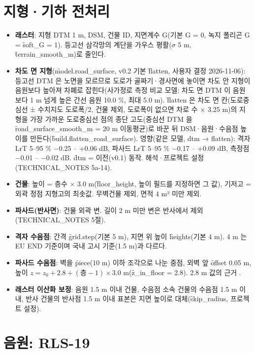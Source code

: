 \documentclass[10.5pt,a4paper]{article}
\begin{document}
\section{지형·기하 전처리}
\begin{itemize}
\item \textbf{래스터}: 지형 DTM 1 m, DSM, 건물 ID, 지면계수 G(기본 G = 0, 녹지 폴리곤 G = \f{soft\_G} = 1). 등고선 삼각망의 계단을 가우스 평활($\sigma$ 5 m, \f{terrain\_smooth\_m})로 줄인다.
\item \textbf{차도 면 지형}(\f{model.road\_surface}, v0.2 기본 \f{flatten}, 사용자 결정 2026-11-06): 등고선 DTM 은 노면을 모르므로 도로가 골짜기·경사면에 놓이면 차도 안 지형이 음원보다 높아져 차폐로 잡힌다(사가정로 측정 비교 모델: 차도 면 DTM 이 음원보다 1 m 넘게 높은 간선 음원 10.0 \%, 최대 5.0 m). \f{flatten} 은 차도 면 칸(도로중심선 ± 수치지도 도로폭/2, 건물 제외, 도로폭이 없으면 차로 수 × 3.25 m)의 지형을 가장 가까운 도로중심선 점의 종단 고도(중심선 DTM 을 \f{road\_surface\_smooth\_m} = 20 m 이동평균)로 바꾼 뒤 DSM·음원·수음점 높이를 만든다(\f{build.flatten\_road\_surface}). 영향(같은 모델, dtm → flatten): 격자 LrT 5–95 \% −0.25 – +0.06 dB, 파사드 LrT 5–95 \% −0.17 – +0.09 dB, 측정점 −0.01 – −0.02 dB. \f{dtm} = 이전(v0.1) 동작. 해석·프로젝트 설정(TECHNICAL\_NOTES 5a-14).
\item \textbf{건물}: 높이 = 층수 × 3.0 m(\f{floor\_height}, 높이 필드를 지정하면 그 값), 기저고 = 외곽 정점 지형고의 최솟값. 무벽건물 제외, 면적 4 m² 미만 제외.
\item \textbf{파사드(반사면)}: 건물 외곽 변. 길이 2 m 미만 변은 반사에서 제외(TECHNICAL\_NOTES 5절).
\item \textbf{격자 수음점}: 간격 \f{grid.step}(기본 5 m), 지면 위 높이 \f{heights}(기본 4 m). 4 m 는 EU END 기준이며 국내 고시 기준(1.5 m)과 다르다.
\item \textbf{파사드 수음점}: 벽을 \f{piece}(10 m) 이하 조각으로 나눈 중점, 외벽 앞 \f{offset} 0.05 m, 높이 $z = z_0 + 2.8 + (\text{층}-1)\times 3.0$ m(\f{z\_in\_floor} = 2.8). 2.8 m 값의 근거 \nob.
\item \textbf{래스터 이산화 보정}: 음원 1.5 m 이내 건물, 수음점 소속 건물의 수음점 1.5 m 이내, 반사 건물의 반사점 1.5 m 이내 표본은 지면 높이로 대체(\f{skip\_radius}, 프로젝트 설정).
\end{itemize}

\section{음원: RLS-19}
\end{document}
